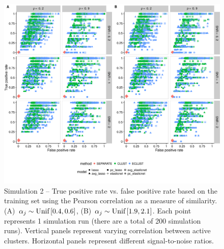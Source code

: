 \begin{figure}
	\includegraphics[scale=0.57, keepaspectratio]{./figs/hydra/results/figures/sim2-sept8/tpr_fpr_Correlation_sim2.png}
	\caption{Simulation 2 -- True positive rate vs. false positive rate based on the training set using the Pearson correlation as a measure of similarity. \mbox{(A) $\alpha_{j} \sim \textrm{{Unif}}\left[0.4, 0.6\right]$}, \mbox{(B) $\alpha_{j} \sim \textrm{{Unif}}\left[1.9, 2.1\right]$}. Each point represents 1 simulation run (there are a total of 200 simulation runs). Vertical panels represent varying correlation between active clusters. Horizontal panels represent different signal-to-noise ratios.}
	\label{fig:tpr_fpr_Correlation_sim2}
\end{figure}



